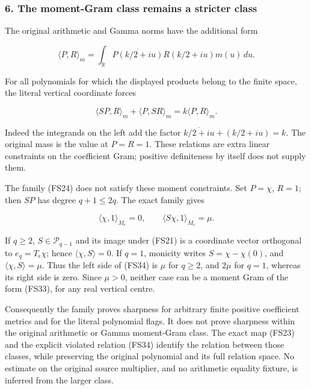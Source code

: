 \subsubsection{6. The moment-Gram class remains a stricter class}\label{endpoint-four_window_sharpness--the-moment-gram-class-remains-a-stricter-class}

The original arithmetic and Gamma norms have the additional form

\[
\langle P,R\rangle_m
=\int_{\mathbb R}\overline{P(k/2+iu)}R(k/2+iu)m(u)\,du.
\tag{FS33}
\]

For all polynomials for which the displayed products belong to the finite space, the literal vertical coordinate forces

\[
\langle SP,R\rangle_m+\langle P,SR\rangle_m
=k\langle P,R\rangle_m.
\tag{FS34}
\]

Indeed the integrands on the left add the factor \(\overline{k/2+iu}+(k/2+iu)=k\). The original mass is the value at \(P=R=1\). These relations are extra linear constraints on the coefficient Gram; positive definiteness by itself does not supply them.

The family (FS24) does not satisfy these moment constraints. Set \(P=\chi\), \(R=1\); then \(SP\) has degree \(q+1\le2q\). The exact family gives

\[
\langle\chi,1\rangle_{M_\epsilon}=0,
\qquad
\langle S\chi,1\rangle_{M_\epsilon}=\mu.
\tag{FS35}
\]

If \(q\ge2\), \(S\in\mathcal P_{q-1}\) and its image under (FS21) is a coordinate vector orthogonal to \(e_q=T_\epsilon\chi\); hence \(\langle\chi,S\rangle=0\). If \(q=1\), monicity writes \(S=\chi-\chi(0)\), and \(\langle\chi,S\rangle=\mu\). Thus the left side of (FS34) is \(\mu\) for \(q\ge2\), and \(2\mu\) for \(q=1\), whereas its right side is zero. Since \(\mu>0\), neither case can be a moment Gram of the form (FS33), for any real vertical centre.

Consequently the family proves sharpness for arbitrary finite positive coefficient metrics and for the literal polynomial flags. It does not prove sharpness within the original arithmetic or Gamma moment-Gram class. The exact map (FS23) and the explicit violated relation (FS34) identify the relation between those classes, while preserving the original polynomial and its full relation space. No estimate on the original source multiplier, and no arithmetic equality fixture, is inferred from the larger class.
